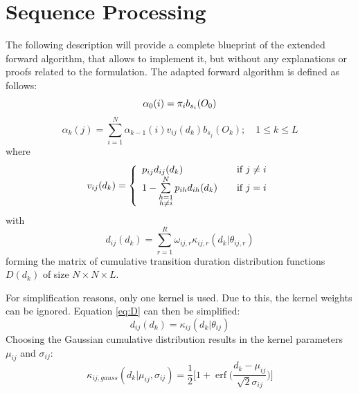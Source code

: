 \documentclass[mscthesis]{usiinfthesis}
\DeclareMathOperator{\erf}{erf}
\begin{document}
\section{Sequence Processing}
\label{ch:event_sequ}

The following description will provide a complete blueprint of the extended
forward algorithm, that allows to implement it, but without any explanations or
proofs related to the formulation. The adapted forward algorithm is defined as
follows:
\begin{equation}
    \label{eq:forward_init}
    \alpha_0(i) = \pi_{i}b_{s_i}(O_0) \\
\end{equation}
\begin{equation}
    \label{eq:forward}
    \alpha_k(j) = \sum_{i=1}^{N} \alpha_{k-1}(i) v_{ij}(d_k) b_{s_j}(O_k);
    \quad 1 \leq k \leq L
\end{equation}
where
\begin{equation}
    \label{eq:V}
    v_{ij}(d_k) = \left\{
        \begin{array}{l l}
            p_{ij} d_{ij}(d_k)
                & \quad \text{if $j \neq i$}\\
            1 - \sum\limits_{\substack{h=1 \\ h \neq i}}^{N} p_{ih} d_{ih}(d_k)
                & \quad \text{if $j = i$}
        \end{array} \right.
\end{equation}
with
\begin{equation}
    \label{eq:D}
    d_{ij}(d_k) = \sum_{r=1}^{R} \omega_{ij,r}\kappa_{ij,r}(d_k|\theta_{ij, r})
\end{equation}
forming the matrix of cumulative transition duration distribution functions
$ D(d_k) $ of size $ N \times N \times L $.

For simplification reasons, only one kernel is used. Due to this, the kernel
weights can be ignored. Equation \ref{eq:D} can then be simplified:
\begin{equation}
    \label{eq:D_fact}
    d_{ij}(d_k) = \kappa_{ij}(d_k | \theta_{ij})
\end{equation}
Choosing the Gaussian cumulative distribution results in the kernel parameters
$ \mu_{ij} $ and $ \sigma_{ij} $:
\begin{equation}
    \label{eq:kernel}
    \kappa_{ij, gauss}(d_k | \mu_{ij}, \sigma_{ij}) = 
    \frac{1}{2}\bigg [1 + \erf \big (\frac{d_k - \mu_{ij}}{\sqrt 2 \sigma_{ij}}\big )
        \bigg ]
\end{equation}
\end{document}
